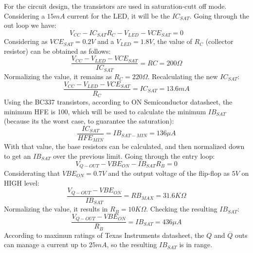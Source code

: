 For the circuit design, the transistors are used in saturation-cutt off mode. 
Considering a $15mA$ current for the LED, it will be the $IC_{SAT}$. Going through 
the out loop we have:
\[
    V_{CC} - IC_{SAT}R_C - V_{LED} - VCE_{SAT} = 0    
\]
Considering as $VCE_{SAT} = 0.2V$ and a $V_{LED} = 1.8V$, the value of $R_C$ (collector resistor) can be obtained as follows:
\[
    \frac{V_{CC} - V_{LED} - VCE_{SAT}}{IC_{SAT}} = RC = 200 \Omega    
\]
Normalizing the value, it remains as $R_C = 220\Omega $. Recalculating the new $IC_{SAT}$:
\[
    \frac{V_{CC} - V_{LED} - VCE_{SAT}}{R_C} = IC_{SAT} = 13.6mA   
\]
Using the BC337 transistors, according to ON Semiconductor datasheet, the minimum HFE is 100, which will 
be used to calculate the minimum $IB_{SAT}$ (because its the worst case, to guarantee the saturation):
\[
    \frac{IC_{SAT}}{HFE_{MIN}} = IB_{SAT-MIN} = 136\mu A    
\]
With that value, the base resistors can be calculated, and then normalized down to get an $IB_{SAT}$ over 
the previous limit. Going through the entry loop:
\[
    V_{Q-OUT} - VBE_{ON} - IB_{SAT}R_B = 0
\]
Considerating that $VBE_{ON} = 0.7V$ and the output voltage of the flip-flop as $5V$ on HIGH level:
\[
    \frac{V_{Q-OUT} - VBE_{ON}}{IB_{SAT}} = RB_{MAX} = 31.6K\Omega    
\]
Normalizing the value, it results in $R_B = 10 K \Omega$. Checking the resulting $IB_{SAT}$:
\[
    \frac{V_{Q-OUT} - VBE_{ON}}{R_B} = IB_{SAT} = 436\mu A   
\]
According to maximun ratings of Texas Instruments datasheet, the $Q$ and $\overline{Q}$ outs can manage a current
up to $25mA$, so the resulting $IB_{SAT}$ is in range.



